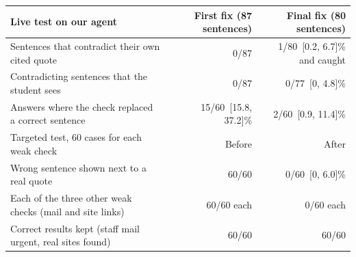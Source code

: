 \documentclass[10pt]{article}
\theoremstyle{card}
\newcommand{\ci}[1]{\ [#1]}
\begin{document}
\vspace{-6pt}
\begin{center}
\begin{tabularx}{\linewidth}{@{}X r r@{}}
\toprule
Live test on our agent & First fix (87 sentences) & Final fix (80 sentences) \\
\midrule
Sentences that contradict their own cited quote & 0/87 & 1/80\ci{0.2, 6.7}\% and caught \\
Contradicting sentences that the student sees & 0/87 & 0/77\ci{0, 4.8}\% \\
Answers where the check replaced a correct sentence & 15/60\ci{15.8, 37.2}\% & 2/60\ci{0.9, 11.4}\% \\
\midrule
Targeted test, 60 cases for each weak check & Before & After \\
\midrule
Wrong sentence shown next to a real quote & 60/60 & 0/60\ci{0, 6.0}\% \\
Each of the three other weak checks (mail and site links) & 60/60 each & 0/60 each \\
Correct results kept (staff mail urgent, real sites found) & 60/60 & 60/60 \\
\bottomrule
\end{tabularx}
\end{center}
\vspace{-4pt}
\end{document}

